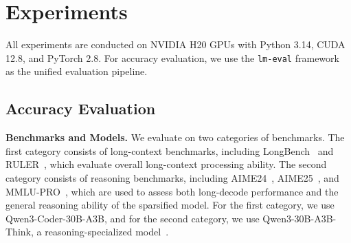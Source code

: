 \section{Experiments}

All experiments are conducted on NVIDIA H20 GPUs with Python 3.14, CUDA 12.8, and PyTorch 2.8. For accuracy evaluation, we use the \texttt{lm-eval} framework~\citep{eval-harness} as the unified evaluation pipeline. 

\subsection{Accuracy Evaluation}
\label{sec:accuracy_eval}

\noindent\textbf{Benchmarks and Models.} We evaluate \name on two categories of benchmarks. The first category consists of long-context benchmarks, including LongBench~\citep{bai-etal-2024-longbench} and RULER~\citep{hsieh2024ruler}, which evaluate overall long-context processing ability. The second category consists of reasoning benchmarks, including AIME24~\citep{AIME24}, AIME25~\citep{AIME25}, and MMLU-PRO~\citep{mmlupro}, which are used to assess both long-decode performance and the general reasoning ability of the sparsified model. For the first category, we use Qwen3-Coder-30B-A3B, and for the second category, we use Qwen3-30B-A3B-Think, a reasoning-specialized model~\citep{qwen3}.



